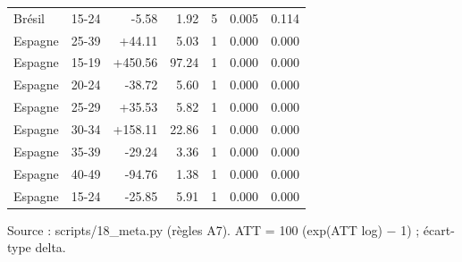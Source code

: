 \begin{table}[htbp]
\begin{threeparttable}
\begin{tabular}{llrrrrr}
Brésil & 15-24 & -5.58 & 1.92 & 5 & 0.005 & 0.114 \\
Espagne & 25-39 & +44.11 & 5.03 & 1 & 0.000 & 0.000 \\
Espagne & 15-19 & +450.56 & 97.24 & 1 & 0.000 & 0.000 \\
Espagne & 20-24 & -38.72 & 5.60 & 1 & 0.000 & 0.000 \\
Espagne & 25-29 & +35.53 & 5.82 & 1 & 0.000 & 0.000 \\
Espagne & 30-34 & +158.11 & 22.86 & 1 & 0.000 & 0.000 \\
Espagne & 35-39 & -29.24 & 3.36 & 1 & 0.000 & 0.000 \\
Espagne & 40-49 & -94.76 & 1.38 & 1 & 0.000 & 0.000 \\
Espagne & 15-24 & -25.85 & 5.91 & 1 & 0.000 & 0.000 \\
\bottomrule
\end{tabular}
\begin{tablenotes}\footnotesize
\item Source : scripts/18\_meta.py (règles A7). ATT = 100 (exp(ATT log) $-$ 1) ; écart-type delta.
\end{tablenotes}
\end{threeparttable}
\end{table}

